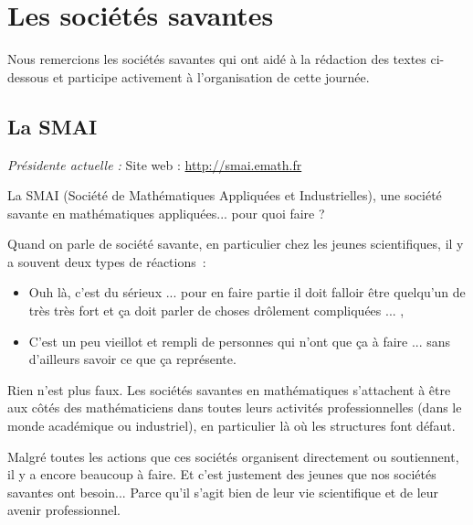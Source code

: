 
\chapter{Les soci\'et\'es savantes}

Nous remercions les soci\'et\'es savantes qui ont aid\'e \`a la r\'edaction des textes ci-dessous et participe activement \`a l'organisation de cette journ\'ee.

\section{La SMAI}

\emph{Pr\'esident\mp e actuel\mp le : } \hfill Site web : \url{http://smai.emath.fr}%
\smallskip

La SMAI (Soci\'et\'e de Math\'ematiques Appliqu\'ees et
Industrielles), une soci\'et\'e savante en math\'ematiques
appliqu\'ees... pour quoi faire ?

Quand on parle de \og soci\'et\'e savante\fg{}, en particulier chez
les jeunes scientifiques, il y a souvent deux types de
r\'eactions~:
\begin{itemize}%
    \item \og Ouh l\`a, c'est du s\'erieux ...
pour en faire partie il doit falloir \^etre quelqu'un de tr\`es
tr\`es fort et \c{c}a doit parler de choses dr\^olement
compliqu\'ees ... \fg{},
\item \og C'est un peu vieillot et rempli de personnes qui
n'ont que \c ca \`a faire ...\fg{}
sans d'ailleurs savoir ce que \og \c ca\fg{}
repr\'esente.
\end{itemize}

Rien n'est plus faux. Les soci\'et\'es savantes en math\'ematiques
s'attachent \`a \^etre aux c\^ot\'es des math\'ematiciens dans
toutes leurs activit\'es professionnelles
(dans le monde acad\'emique ou industriel),
en particulier l\`a o\`u les structures font d\'efaut.

Malgr\'e toutes les actions que ces soci\'et\'es organisent
directement ou soutiennent, il y a encore beaucoup \`a
faire. Et c'est justement des jeunes que nos soci\'et\'es savantes ont
besoin... Parce qu'il s'agit bien de leur vie scientifique et
de leur avenir professionnel.

